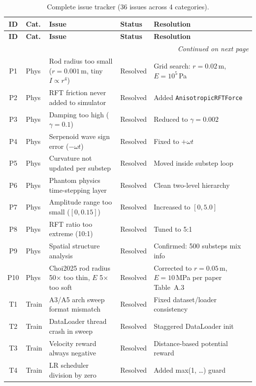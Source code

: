 \documentclass[11pt]{article}
\begin{document}
\begin{longtable}{@{}clp{4.5cm}lp{5.0cm}@{}}
\caption{Complete issue tracker (36 issues across 4 categories).}
\label{tab:issues-all}\\
\toprule
\textbf{ID} & \textbf{Cat.} & \textbf{Issue} & \textbf{Status} & \textbf{Resolution} \\
\midrule
\endfirsthead
\toprule
\textbf{ID} & \textbf{Cat.} & \textbf{Issue} & \textbf{Status} & \textbf{Resolution} \\
\midrule
\endhead
\midrule
\multicolumn{5}{r}{\textit{Continued on next page}} \\
\bottomrule
\endfoot
\bottomrule
\endlastfoot
P1 & Phys & Rod radius too small ($r{=}0.001$\,m, tiny $I \propto r^4$) & Resolved & Grid search: $r{=}0.02$\,m, $E{=}10^5$\,Pa \\
P2 & Phys & RFT friction never added to simulator & Resolved & Added \texttt{AnisotropicRFTForce} \\
P3 & Phys & Damping too high ($\gamma{=}0.1$) & Resolved & Reduced to $\gamma{=}0.002$ \\
P4 & Phys & Serpenoid wave sign error ($-\omega t$) & Resolved & Fixed to $+\omega t$ \\
P5 & Phys & Curvature not updated per substep & Resolved & Moved inside substep loop \\
P6 & Phys & Phantom physics time-stepping layer & Resolved & Clean two-level hierarchy \\
P7 & Phys & Amplitude range too small ($[0, 0.15]$) & Resolved & Increased to $[0, 5.0]$ \\
P8 & Phys & RFT ratio too extreme (10:1) & Resolved & Tuned to 5:1 \\
P9 & Phys & Spatial structure analysis & Resolved & Confirmed: 500 substeps mix info \\
P10 & Phys & Choi2025 rod radius 50$\times$ too thin, $E$ 5$\times$ too soft & Resolved & Corrected to $r{=}0.05$\,m, $E{=}10$\,MPa per paper Table~A.3 \\
\addlinespace
T1 & Train & A3/A5 arch sweep format mismatch & Resolved & Fixed dataset/loader consistency \\
T2 & Train & DataLoader thread crash in sweep & Resolved & Staggered DataLoader init \\
T3 & Train & Velocity reward always negative & Resolved & Distance-based potential reward \\
T4 & Train & LR scheduler division by zero & Resolved & Added max(1, \ldots) guard \\

\end{longtable}
\end{document}
